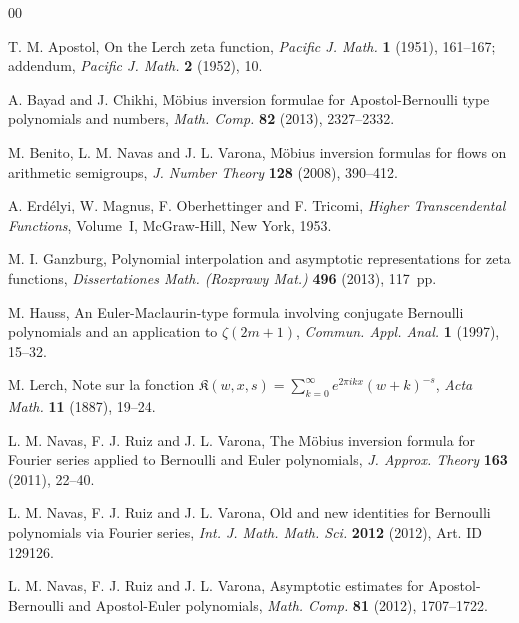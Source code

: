\documentclass[11pt,a4paper,reqno]{amsart}
\theoremstyle{plain}
\theoremstyle{remark}
\numberwithin{equation}{section}
\begin{document}
\begin{thebibliography}{00}

T. M. Apostol,
On the Lerch zeta function,
\textit{Pacific J. Math.}
\textbf{1} (1951), 161--167;
addendum, \textit{Pacific J. Math.} \textbf{2} (1952), 10.

A. Bayad and J. Chikhi,
M\"obius inversion formulae for Apostol-Bernoulli type polynomials and numbers,
\textit{Math. Comp.}
\textbf{82} (2013),
2327--2332.

M. Benito, L. M. Navas and J. L. Varona,
M\"{o}bius inversion formulas for flows on arithmetic semigroups,
\textit{J. Number Theory}
\textbf{128} (2008),
390--412.

A. Erd\'{e}lyi, W. Magnus, F. Oberhettinger and F. Tricomi,
\textit{Higher Transcendental Functions}, Volume~I,
McGraw-Hill, New York, 1953.

M. I. Ganzburg,
Polynomial interpolation and asymptotic representations for zeta functions, 
\textit{Dissertationes Math. (Rozprawy Mat.)} \textbf{496} (2013), 117~pp.

 M. Hauss,
An Euler-Maclaurin-type formula involving conjugate Bernoulli polynomials and an
application to $\zeta(2m+1)$,
\textit{Commun. Appl. Anal.}
\textbf{1} (1997), 15--32.

M. Lerch,
Note sur la fonction $\mathfrak{K}(w,x,s) = \sum_{k=0}^{\infty} e^{2\pi ikx}(w+k)^{-s}$,
\textit{Acta Math.}
\textbf{11} (1887), 19--24.


L. M. Navas, F. J. Ruiz and J. L. Varona,
The M\"obius inversion formula for Fourier series
applied to Bernoulli and Euler polynomials,
\textit{J. Approx. Theory}
\textbf{163} (2011), 22--40.

L. M. Navas, F. J. Ruiz and J. L. Varona,
Old and new identities for Bernoulli polynomials via Fourier series,
\textit{Int. J. Math. Math. Sci.}
\textbf{2012} (2012), Art. ID 129126.

L. M. Navas, F. J. Ruiz and J. L. Varona,
Asymptotic estimates for Apostol-Bernoulli and Apostol-Euler polynomials,
\textit{Math. Comp.}
\textbf{81} (2012), 1707--1722.


\end{thebibliography}
\end{document}
